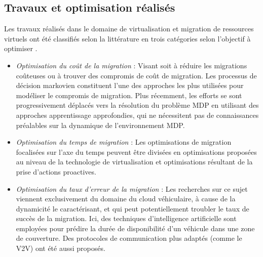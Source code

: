 \subsection{Travaux et optimisation réalisés}
Les travaux réalisés dans le domaine de virtualisation et migration de ressources virtuels ont été classifiés selon la littérature en trois catégories selon l'objectif à optimiser \cite{rejiba2019}.
\begin{itemize}
  \item \emph{Optimisation du coût de la migration} : Visant soit à réduire les migrations coûteuses ou à trouver des compromis de coût de migration. Les processus de décision markovien constituent l'une des approches les plus utilisées pour modéliser le compromis de migration. Plus récemment, les efforts se sont progressivement déplacés vers la résolution du problème MDP en utilisant des approches apprentissage approfondies, qui ne nécessitent pas de connaissances préalables sur la dynamique de l'environnement MDP.
  \item \emph{Optimisation du temps de migration} : Les optimisations de migration focalisées sur l'axe du temps peuvent être divisées en optimisations proposées au niveau de la technologie de virtualisation et optimisations résultant de la prise d'actions proactives.
  \item \emph{Optimisation du taux d'erreur de la migration} : Les recherches sur ce sujet viennent exclusivement du domaine du cloud véhiculaire, à cause de la dynamicité le caractérisant, et qui peut potentiellement troubler le taux de succès de la migration. Ici, des techniques d'intelligence artificielle sont employées pour prédire la durée de disponibilité d'un véhicule dans une zone de couverture. Des protocoles de communication plus adaptés (comme le V2V) ont été aussi proposés.
\end{itemize}
